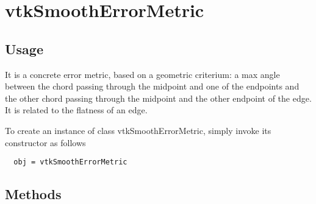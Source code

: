 \section{vtkSmoothErrorMetric}

\subsection{Usage}

 It is a concrete error metric, based on a geometric criterium:
 a max angle between the chord passing through the midpoint and one of the
 endpoints and the other chord passing through the midpoint and the other
 endpoint of the edge. It is related to the flatness of an edge.


To create an instance of class vtkSmoothErrorMetric, simply
invoke its constructor as follows
\begin{verbatim}
  obj = vtkSmoothErrorMetric
\end{verbatim}
\subsection{Methods}

